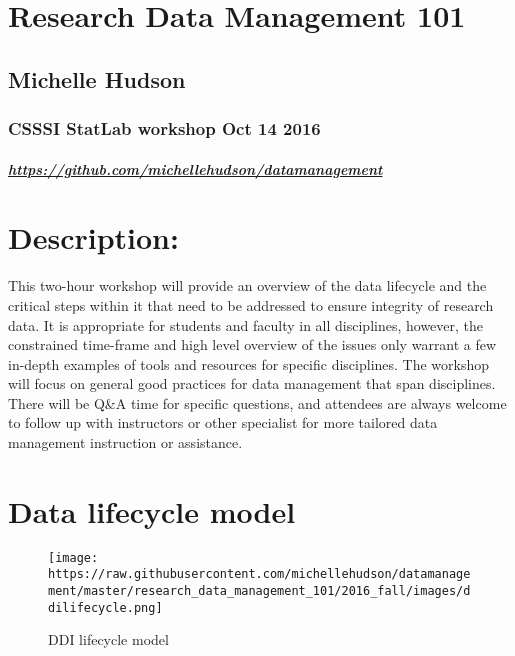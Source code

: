 \section{Research Data Management
101}\label{research-data-management-101}

\subsection{Michelle Hudson}\label{michelle-hudson}

\subsubsection{CSSSI StatLab workshop Oct 14
2016}\label{csssi-statlab-workshop-oct-14-2016}

\subparagraph{\texorpdfstring{\url{https://github.com/michellehudson/datamanagement}}{https://github.com/michellehudson/datamanagement}}\label{httpsgithub.commichellehudsondatamanagement}

\section{Description:}\label{description}

This two-hour workshop will provide an overview of the data lifecycle
and the critical steps within it that need to be addressed to ensure
integrity of research data. It is appropriate for students and faculty
in all disciplines, however, the constrained time-frame and high level
overview of the issues only warrant a few in-depth examples of tools and
resources for specific disciplines. The workshop will focus on general
good practices for data management that span disciplines. There will be
Q\&A time for specific questions, and attendees are always welcome to
follow up with instructors or other specialist for more tailored data
management instruction or assistance.

\section{Data lifecycle model}\label{data-lifecycle-model}

\begin{figure}[htbp]
\centering
\texttt{[image: https://raw.githubusercontent.com/michellehudson/datamanagement/master/research\_data\_management\_101/2016\_fall/images/ddilifecycle.png]}
\caption{DDI lifecycle model}
\end{figure}

